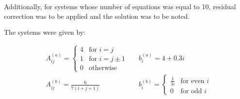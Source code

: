 \documentclass{article}
\begin{document}
	Additionally, for systems whose number of equations was equal to 10,
	residual correction was to be applied and the solution was to be noted.
	
	The systems were given by:
	
	\noindent
	\begin{align*}
		&A_{ij}^{(a)} =
		\begin{cases} 
			4 & \text{for } i = j \\
			1 & \text{for } i = j \pm 1 \\
			0 & \text{otherwise}
		\end{cases}
		&&
		b_i^{(a)} = 4 + 0.3i
		\\
		&A_{ij}^{(b)} = \frac{6}{7(i + j + 1)}
		&&
		b_i^{(b)} =
		\begin{cases} 
			\frac{1}{3i} & \text{for even } i\\
			0 & \text{for odd } i
		\end{cases}
	\end{align*}
	
\end{document}
